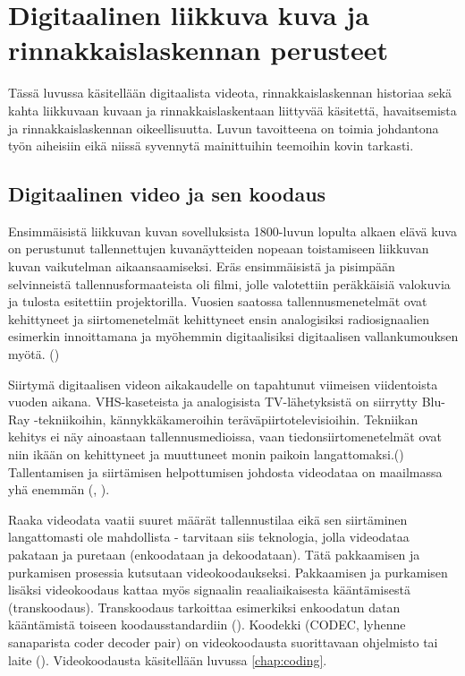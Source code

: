 \section{Digitaalinen liikkuva kuva ja rinnakkaislaskennan perusteet}
\label{chap:intro}

Tässä luvussa käsitellään digitaalista videota, rinnakkaislaskennan historiaa
sekä kahta liikkuvaan kuvaan ja rinnakkaislaskentaan liittyvää käsitettä,
havaitsemista ja rinnakkaislaskennan oikeellisuutta. Luvun tavoitteena on
toimia johdantona työn aiheisiin eikä niissä syvennytä mainittuihin teemoihin
kovin tarkasti.

\subsection{Digitaalinen video ja sen koodaus}

Ensimmäisistä liikkuvan kuvan sovelluksista 1800-luvun lopulta
alkaen elävä kuva on perustunut tallennettujen kuvanäytteiden nopeaan toistamiseen
liikkuvan kuvan vaikutelman aikaansaamiseksi.
Eräs ensimmäisistä ja pisimpään selvinneistä tallennusformaateista oli filmi,
jolle valotettiin peräkkäisiä valokuvia ja tulosta esitettiin projektorilla.
Vuosien saatossa tallennusmenetelmät ovat kehittyneet ja siirtomenetelmät
kehittyneet ensin analogisiksi radiosignaalien esimerkin innoittamana ja
myöhemmin digitaalisiksi digitaalisen vallankumouksen myötä. (\citealt{mitra})

Siirtymä digitaalisen videon aikakaudelle on tapahtunut viimeisen viidentoista
vuoden aikana. VHS-kaseteista ja analogisista TV-lähetyksistä
on siirrytty Blu-Ray -tekniikoihin, kännykkäkameroihin
teräväpiirtotelevisioihin. Tekniikan kehitys ei näy ainoastaan tallennusmedioissa,
vaan tiedonsiirtomenetelmät ovat niin ikään on kehittyneet ja muuttuneet monin paikoin
langattomaksi.(\citealt{h264})
Tallentamisen ja siirtämisen helpottumisen johdosta videodataa on maailmassa
yhä enemmän (\citealt{cisco}, \citealt{youtube}).

Raaka videodata vaatii suuret määrät tallennustilaa eikä sen siirtäminen
langattomasti ole mahdollista - tarvitaan siis teknologia, jolla videodataa pakataan ja puretaan
(enkoodataan ja dekoodataan). Tätä pakkaamisen ja purkamisen prosessia
kutsutaan videokoodaukseksi. Pakkaamisen ja purkamisen lisäksi videokoodaus kattaa
myös signaalin reaaliaikaisesta kääntämisestä (transkoodaus). Transkoodaus
tarkoittaa esimerkiksi enkoodatun datan kääntämistä toiseen koodausstandardiin (\citealt{mpeg_app}).
Koodekki (CODEC, lyhenne sanaparista coder decoder pair) on videokoodausta suorittavaan
ohjelmisto tai laite (\citealt{h264}). Videokoodausta käsitellään luvussa \ref{chap:coding}.

